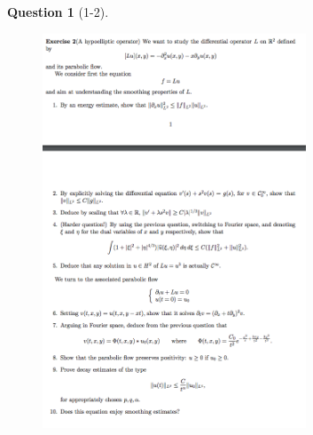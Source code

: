 \documentclass[11pt]{article}
\theoremstyle{plain}
\theoremstyle{quest}
\newtheorem*{question}{Question}
\begin{document}
\begin{question}[1-2]
\hfill
\begin{figure}[h!]
  \centering
    \includegraphics[width=0.7\textwidth]{pde2-f-p2.png}
\end{figure}
\end{question}
\end{document}

